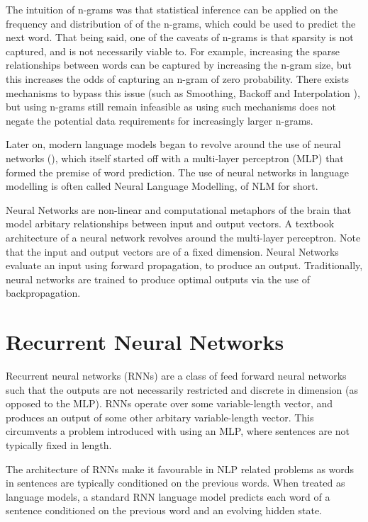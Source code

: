 \documentclass[12pt,twoside]{report}
\begin{document}
The intuition of n-grams was that statistical inference can be applied on the frequency and distribution of of the n-grams, which could be used to predict the next word. That being said, one of the caveats of n-grams is that sparsity is not captured, and is not necessarily viable to. For example, increasing the sparse relationships between words can be captured by increasing the n-gram size, but this increases the odds of capturing an n-gram of zero probability. There exists mechanisms to bypass this issue (such as Smoothing, Backoff and Interpolation \cite{jurafsky_speech_2019}), but using n-grams still remain infeasible as using such mechanisms does not negate the potential data requirements for increasingly larger n-grams.

Later on, modern language models began to revolve around the use of neural networks (\cite{bengio_neural_2001}), which itself started off with a multi-layer perceptron (MLP) that formed the premise of word prediction. The use of neural networks in language modelling is often called Neural Language Modelling, of NLM for short.

Neural Networks are non-linear and computational metaphors of the brain that model arbitary relationships between input and output vectors. A textbook architecture of a neural network revolves around the multi-layer perceptron. Note that the input and output vectors are of a fixed dimension. Neural Networks evaluate an input using forward propagation, to produce an output. Traditionally, neural networks are trained to produce optimal outputs via the use of backpropagation. 

\section{Recurrent Neural Networks}
\label{rnn}

Recurrent neural networks (RNNs) are a class of feed forward neural networks such that the outputs are not necessarily restricted and discrete in dimension (as opposed to the MLP). RNNs operate over some  variable-length vector, and produces an output of some other arbitary  variable-length vector. This circumvents a problem introduced with using an MLP, where sentences are not typically fixed in length. 

The architecture of RNNs make it favourable in NLP related problems as words in sentences are typically conditioned on the previous words. When treated as language models, a standard RNN language model predicts each word of a sentence conditioned on the previous word and an evolving hidden state.
\end{document}
